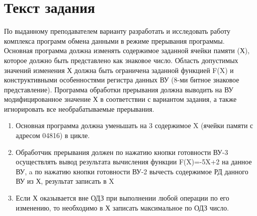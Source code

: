 \section{Текст задания}
По выданному преподавателем варианту разработать и исследовать работу комплекса программ обмена данными в режиме прерывания программы.
Основная программа должна изменять содержимое заданной ячейки памяти (Х), которое должно быть представлено как знаковое число.
Область допустимых значений изменения Х должна быть ограничена заданной функцией F(X) и конструктивными особенностями регистра данных ВУ (8-ми битное знаковое представление).
Программа обработки прерывания должна выводить на ВУ модифицированное значение Х в соответствии с вариантом задания, а также игнорировать все необрабатываемые прерывания.

\begin{enumerate}
\item Основная программа должна уменьшать на 3 содержимое X (ячейки памяти с адресом 04816) в цикле.
\item Обработчик прерывания должен по нажатию кнопки готовности ВУ-3 осуществлять вывод результата вычисления функции F(X)=-5X+2 на данное ВУ,
a по нажатию кнопки готовности ВУ-2 вычесть содержимое РД данного ВУ из Х, результат записать в X
\item Если Х оказывается вне ОДЗ при выполнении любой операции по его изменению, то необходимо в Х записать максимальное по ОДЗ число.

\end{enumerate}

